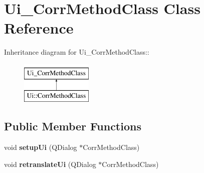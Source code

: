 \hypertarget{classUi__CorrMethodClass}{
\section{Ui\_\-CorrMethodClass Class Reference}
\label{classUi__CorrMethodClass}
}
Inheritance diagram for Ui\_\-CorrMethodClass::\begin{figure}[H]
\begin{center}
\leavevmode
\includegraphics[height=2cm]{classUi__CorrMethodClass}
\end{center}
\end{figure}
\subsection*{Public Member Functions}
\begin{DoxyCompactItemize}
\item 
\hypertarget{classUi__CorrMethodClass_a95a6bbb76de087aa2f8f5ea4780a4d09}{
void {\bfseries setupUi} (QDialog $\ast$CorrMethodClass)}
\label{classUi__CorrMethodClass_a95a6bbb76de087aa2f8f5ea4780a4d09}

\item 
\hypertarget{classUi__CorrMethodClass_a4ac1c93be0509c13a248873b5dd7e2fb}{
void {\bfseries retranslateUi} (QDialog $\ast$CorrMethodClass)}
\label{classUi__CorrMethodClass_a4ac1c93be0509c13a248873b5dd7e2fb}

\end{DoxyCompactItemize}
